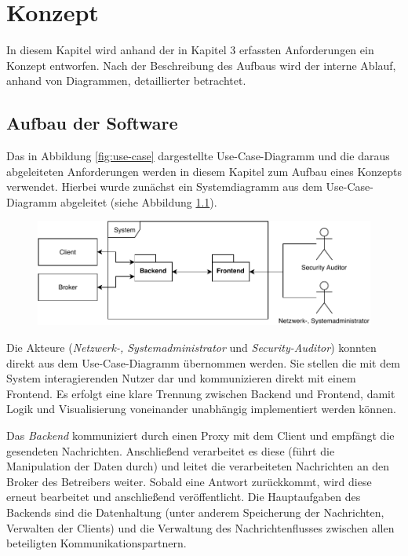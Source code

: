 \chapter{Konzept}
In diesem Kapitel wird anhand der in Kapitel 3 erfassten Anforderungen ein Konzept entworfen. Nach der Beschreibung des Aufbaus wird der interne Ablauf, anhand von Diagrammen, detaillierter betrachtet.

\section{Aufbau der Software}
    Das in Abbildung \ref{fig:use-case} dargestellte Use-Case-Diagramm und die daraus abgeleiteten Anforderungen werden in diesem Kapitel zum Aufbau eines Konzepts verwendet.
    Hierbei wurde zunächst ein Systemdiagramm aus dem Use-Case-Diagramm abgeleitet (siehe Abbildung \ref{fig:system_all}).
    
    \begin{figure}[h]%
        \centering
        \includegraphics[width=14cm]{tex/bilder/4_konzept/Systemdiagram.pdf}
        \label{fig:system_all}
    \end{figure}
    
    Die Akteure (\emph{Netzwerk-, Systemadministrator} und \emph{Security-Auditor}) konnten direkt aus dem Use-Case-Diagramm übernommen werden.
    Sie stellen die mit dem System interagierenden Nutzer dar und kommunizieren direkt mit einem Frontend.
    Es erfolgt eine klare Trennung zwischen Backend und Frontend, damit Logik und Visualisierung voneinander unabhängig implementiert werden können.
    
    Das \emph{Backend} kommuniziert durch einen Proxy mit dem Client und empfängt die gesendeten Nachrichten. Anschließend verarbeitet es diese (führt die Manipulation der Daten durch) und leitet die verarbeiteten Nachrichten an den Broker des Betreibers weiter. Sobald eine Antwort zurückkommt, wird diese erneut bearbeitet und anschließend veröffentlicht.
    Die Hauptaufgaben des Backends sind die Datenhaltung (unter anderem Speicherung der Nachrichten, Verwalten der Clients) und die Verwaltung des Nachrichtenflusses zwischen allen beteiligten Kommunikationspartnern.
    

